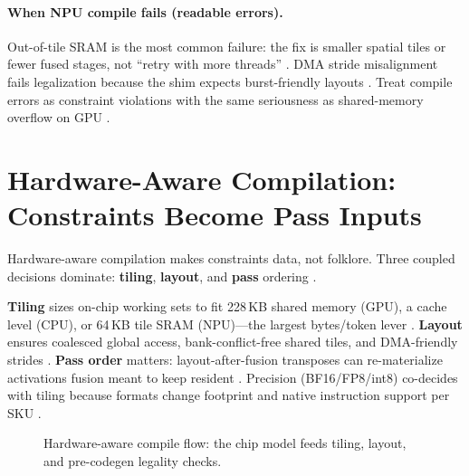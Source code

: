 \paragraph{When NPU compile fails (readable errors).}
Out-of-tile SRAM is the most common failure: the fix is smaller spatial tiles or fewer fused stages, not ``retry with more threads'' \citep{amd2024xdna}.
DMA stride misalignment fails legalization because the shim expects burst-friendly layouts \citep{amd2024aie}.
Treat compile errors as constraint violations with the same seriousness as shared-memory overflow on GPU \citep{chen2020compilerbasedhardw,yirage2026}.

\section{Hardware-Aware Compilation: Constraints Become Pass Inputs}
\label{sec:hardware_aware_compile}

Hardware-aware compilation makes constraints data, not folklore.
Three coupled decisions dominate: \textbf{tiling}, \textbf{layout}, and \textbf{pass} ordering \citep{chen2020compilerbasedhardw,lai2023relax}.

\textbf{Tiling} sizes on-chip working sets to fit 228\,KB shared memory (GPU), a cache level (CPU), or 64\,KB tile SRAM (NPU)---the largest bytes/token lever \citep{nvidia2022hopper,amd2024aie}.
\textbf{Layout} ensures coalesced global access, bank-conflict-free shared tiles, and DMA-friendly strides \citep{shah2024flashattention3}.
\textbf{Pass order} matters: layout-after-fusion transposes can re-materialize activations fusion meant to keep resident \citep{lai2023relax,chen2018tvm}.
Precision (BF16/FP8/int8) co-decides with tiling because formats change footprint and native instruction support per SKU \citep{shah2024flashattention3,liu2024deepseekv3}.

\begin{figure}[t]
\centering
{}
\caption{Hardware-aware compile flow: the chip model feeds tiling, layout, and pre-codegen legality checks.}
\label{fig:hw_aware_compile_flow}
\end{figure}

